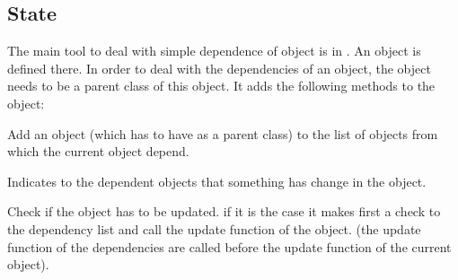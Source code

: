 \documentclass[a4paper,11pt,english]{sphinxmanual}
\begin{document}
\subsection{State}
\label{\detokenize{project/libdesc_event:state}}
The main tool to deal with simple dependence of object is in
. An object  is defined there. In
order to deal with the dependencies of an object, the object
 needs to be a parent class of this object. It adds the
following methods to the object:

\begin{fulllineitems}
\label{\detokenize{project/libdesc_event:_CPPv4N6getfem20context_dependencies14add_dependencyE2ct}}%
\pysigstartmultiline
{}%
\pysigstopmultiline
Add an object (which has to have  as a parent class)
to the list of objects from which the current object depend.

\end{fulllineitems}


\begin{fulllineitems}
\label{\detokenize{project/libdesc_event:_CPPv4N6getfem20context_dependencies5touchEv}}%
\pysigstartmultiline
{}%
\pysigstopmultiline
Indicates to the dependent objects that something has change in the object.

\end{fulllineitems}


\begin{fulllineitems}
\label{\detokenize{project/libdesc_event:_CPPv4N6getfem20context_dependencies13context_checkEv}}%
\pysigstartmultiline
{}%
\pysigstopmultiline
Check if the object has to be updated. if it is the case it makes first a
check to the dependency list and call the update function of the object. (the
update function of the dependencies are called before the update function of
the current object).

\end{fulllineitems}
\end{document}
